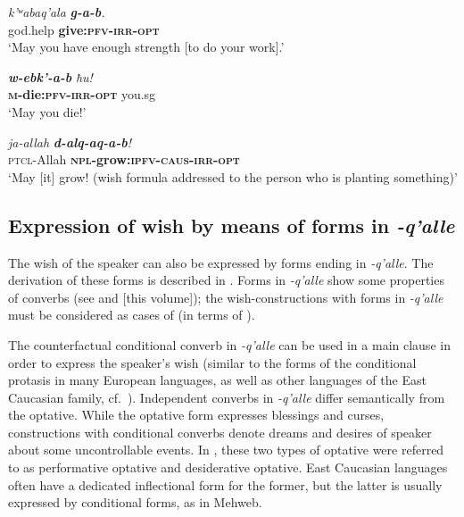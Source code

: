 ﻿\documentclass[output=paper]{langsci/langscibook}
\begin{document}
\ex %
\gll \emph{k'ʷabaq'ala} \emph{\textbf{g-a-b}.}\\
 god.help\footnotemark{} \textbf{give:\textsc{pfv}-\textsc{irr}-\textsc{opt}}\\
\glt `May you have enough strength [to do your work].'


\ex %
\gll \emph{\textbf{w-ebk'-a-b}} \emph{ħu!}\\
 \textbf{\textsc{m}-die:\textsc{pfv}-\textsc{irr}-\textsc{opt}} you.sg\\
\glt `May you die!'

\ex %
\gll \emph{ja-allah} \emph{\textbf{d-alq-aq-a-b}!} \\
 \textsc{ptcl}-Allah \textbf{\textsc{npl}-grow:\textsc{ipfv}-\textsc{caus}-\textsc{irr}-\textsc{opt}} \\
\glt `May [it] grow! (wish formula addressed to the person who is
planting something)'
\z

\largerpage


\subsection{Expression of wish by means of forms in  \emph{-q'alle}}\label{expression-of-wish}


The wish of the speaker can also be expressed by forms ending in
\emph{-q'alle}. The derivation of these forms is described in .
Forms in \emph{-q'alle} show some properties of {converbs} (see 
and \citealt{sheyanova2019} [this volume]); the wish-constructions with forms in
\emph{-q'alle} must be considered as cases of  (in terms
of \citealt{evans2007}).

The counterfactual conditional converb in \emph{-q'alle} can be used in
a main clause in order to express the speaker's wish (similar to the
forms of the conditional protasis in many European languages, as well as
other languages of the East Caucasian family, cf.\ \citealt{belyaev2012}).
Independent converbs in \emph{-q'alle} differ semantically from the
optative. While the optative form expresses blessings and curses,
constructions with conditional converbs denote dreams and desires of
speaker about some uncontrollable events. In \citet{dobrushina2011}, these two
types of optative were referred to as performative optative and
desiderative optative. East Caucasian languages often have a dedicated
inflectional form for the former, but the latter is usually expressed by
conditional forms, as in Mehweb.
\end{document}
